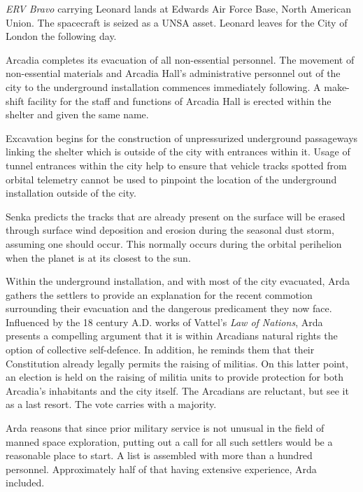 {\it ERV Bravo} carrying Leonard lands at Edwards Air Force Base, North American Union. The spacecraft is seized as a UNSA asset. Leonard leaves for the City of London the following day.
\StopTimelineDate

Arcadia completes its evacuation of all non-essential personnel. The movement of non-essential materials and Arcadia Hall's administrative personnel out of the city to the underground installation commences immediately following. A make-shift facility for the staff and functions of Arcadia Hall is erected within the shelter and given the same name.

Excavation begins for the construction of unpressurized underground passageways linking the shelter which is outside of the city with entrances within it. Usage of tunnel entrances within the city help to ensure that vehicle tracks spotted from orbital telemetry cannot be used to pinpoint the location of the underground installation outside of the city. 

Senka predicts the tracks that are already present on the surface will be erased through surface wind deposition and erosion during the seasonal dust storm, assuming one should occur. This normally occurs during the orbital perihelion when the planet is at its closest to the sun.

Within the underground installation, and with most of the city evacuated, Arda gathers the settlers to provide an explanation for the recent commotion surrounding their evacuation and the dangerous predicament they now face. Influenced by the 18 century A.D. works of Vattel's {\it Law of Nations}, Arda presents a compelling argument that it is within Arcadians natural rights the option of collective self-defence. In addition, he reminds them that their Constitution already legally permits the raising of militias. On this latter point, an election is held on the raising of militia units to provide protection for both Arcadia's inhabitants and the city itself. The Arcadians are reluctant, but see it as a last resort. The vote carries with a majority.

Arda reasons that since prior military service is not unusual in the field of manned space exploration, putting out a call for all such settlers would be a reasonable place to start. A list is assembled with more than a hundred personnel. Approximately half of that having extensive experience, Arda included.
\StopTimelineDate

